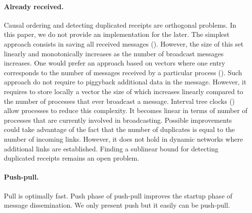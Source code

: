 \paragraph{Already received.} Causal ordering and detecting duplicated receipts
are orthogonal problems. In this paper, we do not provide an implementation for
the later. The simplest approach consists in saving all received messages
(\REF). However, the size of this set linearly and monotonically increases as
the number of broadcast messages increases. One would prefer an approach based
on vectors where one entry corresponds to the number of messages received by a
particular process (\REF). Such approach do not require to piggyback additional
data in the message. However, it requires to store locally a vector the size of
which increases linearly compared to the number of processes that ever broadcast
a message. Interval tree clocks (\REF) allow processes to reduce this
complexity. It becomes linear in terms of number of processes that are currently
involved in broadcasting. Possible improvements could take advantage of the fact
that the number of duplicates is equal to the number of incoming links. However,
it does not hold in dynamic networks where additional links are
established. Finding a sublinear bound for detecting duplicated receipts remains
an open problem.


\paragraph{Push-pull.} Pull is optimally fast. Push phase of push-pull improves
the startup phase of message dissemination. We only present push but it easily
can be push-pull.



